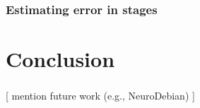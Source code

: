 \documentclass{beamer}
\begin{document}
\begin{frame}\frametitle{Estimating error in stages}
        \centering
	
\end{frame}

\section{Conclusion}
\begin{frame}\frametitle{\secname}
	[
		mention future work (e.g., NeuroDebian)
	]
\end{frame}


\end{document}

